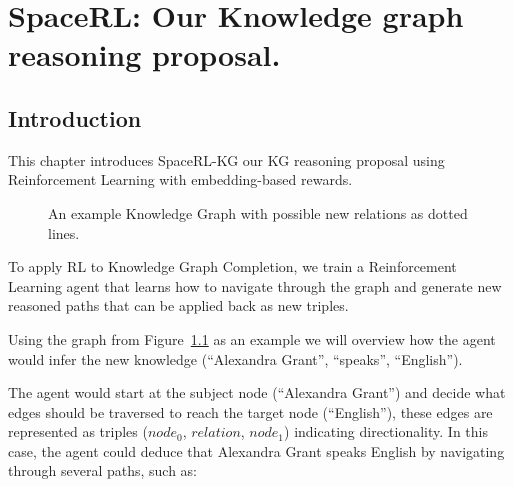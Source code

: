 \chapter{SpaceRL: Our Knowledge graph reasoning proposal.}\label{chap:SpaceRL}



\section{Introduction}\label{sec:spacerl-intro}
This chapter introduces SpaceRL-KG our KG reasoning proposal using Reinforcement Learning with embedding-based rewards.

\begin{figure}[htp]
    \centering
    
    \caption{An example Knowledge Graph with possible new relations as dotted lines.}
    \label{fig:kg-example}
\end{figure}

To apply RL to Knowledge Graph Completion, we train a Reinforcement Learning agent that learns how to navigate through the graph and generate new reasoned paths that can be applied back as new triples.

Using the graph from Figure~\ref{fig:kg-example} as an example we will overview how the agent would infer the new knowledge (``Alexandra Grant'', ``speaks'', ``English'').

The agent would start at the subject node (``Alexandra Grant'') and decide what edges should be traversed to reach the target node (``English''), these edges are represented as triples ($node_0$, $relation$, $node_1$) indicating directionality.
In this case, the agent could deduce that Alexandra Grant speaks English by navigating through several paths, such as:


